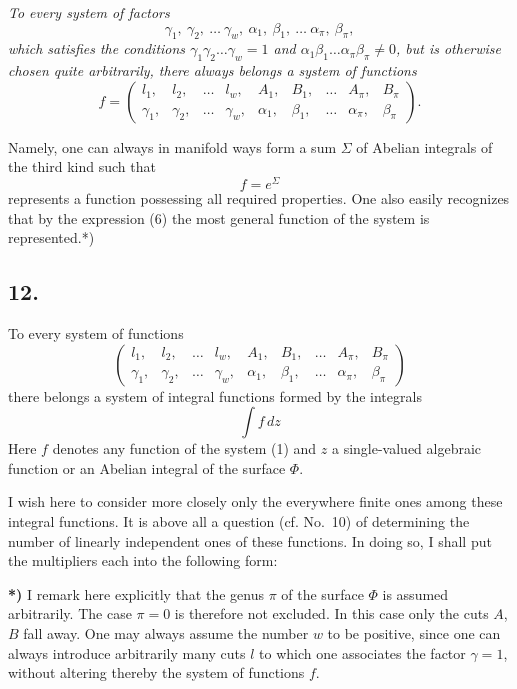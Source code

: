 \documentclass{article}
\begin{document}
\emph{To every system of factors}
\[
\gamma_1, \ \gamma_2, \ \dots \ \gamma_w, \ \alpha_1, \ \beta_1, \ \dots \ \alpha_\pi, \ \beta_\pi,
\]
\emph{which satisfies the conditions $\gamma_1 \gamma_2 \dots \gamma_w = 1$ and $\alpha_1 \beta_1 \dots \alpha_\pi \beta_\pi \neq 0$, but is otherwise chosen quite arbitrarily, there always belongs a system of functions}
\[
f = \begin{pmatrix}
l_1, & l_2, & \dots & l_w, & A_1, & B_1, & \dots & A_\pi, & B_\pi \\
\gamma_1, & \gamma_2, & \dots & \gamma_w, & \alpha_1, & \beta_1, & \dots & \alpha_\pi, & \beta_\pi
\end{pmatrix}.
\]

Namely, one can always in manifold ways form a sum $\varSigma$ of Abelian integrals of the third kind such that
\[
f = e^{\varSigma} \tag{6}
\]
represents a function possessing all required properties. One also easily recognizes that by the expression (6) the most general function of the system is represented.*)

\subsection*{12.}

To every system of functions
\[
\begin{pmatrix}
l_1, & l_2, & \dots & l_w, & A_1, & B_1, & \dots & A_\pi, & B_\pi \\
\gamma_1, & \gamma_2, & \dots & \gamma_w, & \alpha_1, & \beta_1, & \dots & \alpha_\pi, & \beta_\pi
\end{pmatrix} \tag{1}
\]
there belongs a system of integral functions formed by the integrals
\[
\int f\,dz
\]
Here $f$ denotes any function of the system (1) and $z$ a single-valued algebraic function or an Abelian integral of the surface $\Phi$.

I wish here to consider more closely only the everywhere finite ones among these integral functions. It is above all a question (cf. No.~10) of determining the number of linearly independent ones of these functions. In doing so, I shall put the multipliers each into the following form:

\textbf{*)} I remark here explicitly that the genus $\pi$ of the surface $\Phi$ is assumed arbitrarily. The case $\pi = 0$ is therefore not excluded. In this case only the cuts $A$, $B$ fall away. One may always assume the number $w$ to be positive, since one can always introduce arbitrarily many cuts $l$ to which one associates the factor $\gamma = 1$, without altering thereby the system of functions $f$.
\end{document}
